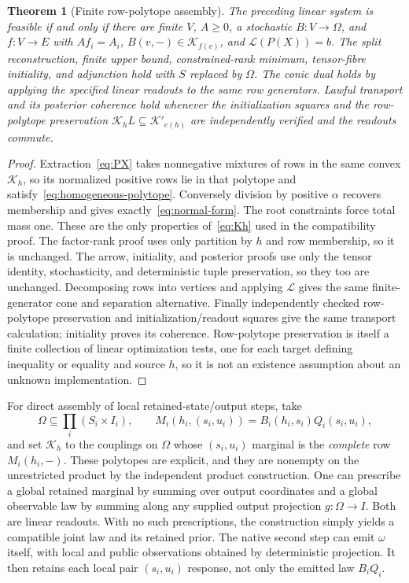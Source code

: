 \documentclass[11pt]{article}
\newcommand{\Kcal}{\mathcal K}
\newtheorem{theorem}{Theorem}[section]
\theoremstyle{remark}
\begin{document}
\begin{theorem}[Finite row-polytope assembly]\label{thm:umbrella}
The preceding linear system is feasible if and only if there are finite $V$, $A\ge0$, a stochastic $B:V\to\Omega$, and $f:V\to E$ with $Af_i=A_i$, $B(v,-)\in\Kcal_{f(v)}$, and $\mathcal L(P(X))=b$. The split reconstruction, finite upper bound, constrained-rank minimum, tensor-fibre initiality, and adjunction hold with $S$ replaced by $\Omega$. The conic dual holds by applying the specified linear readouts to the same row generators. Lawful transport and its posterior coherence hold whenever the initialization squares and the row-polytope preservation $\Kcal_hL\subseteq\Kcal'_{e(h)}$ are independently verified and the readouts commute.
\end{theorem}
\begin{proof}
Extraction~\eqref{eq:PX} takes nonnegative mixtures of rows in the same convex $\Kcal_h$, so its normalized positive rows lie in that polytope and satisfy~\eqref{eq:homogeneous-polytope}. Conversely division by positive $\alpha$ recovers membership and gives exactly~\eqref{eq:normal-form}. The root constraints force total mass one. These are the only properties of~\eqref{eq:Kh} used in the compatibility proof. The factor-rank proof uses only partition by $h$ and row membership, so it is unchanged. The arrow, initiality, and posterior proofs use only the tensor identity, stochasticity, and deterministic tuple preservation, so they too are unchanged. Decomposing rows into vertices and applying $\mathcal L$ gives the same finite-generator cone and separation alternative. Finally independently checked row-polytope preservation and initialization/readout squares give the same transport calculation; initiality proves its coherence. Row-polytope preservation is itself a finite collection of linear optimization tests, one for each target defining inequality or equality and source $h$, so it is not an existence assumption about an unknown implementation.
\end{proof}

For direct assembly of local retained-state/output steps, take
\[
 \Omega\subseteq\prod_i(S_i\times I_i),\qquad
 M_i(h_i,(s_i,u_i))=B_i(h_i,s_i)Q_i(s_i,u_i),
\]
and set $\Kcal_h$ to the couplings on $\Omega$ whose $(s_i,u_i)$ marginal is the \emph{complete} row $M_i(h_i,-)$. These polytopes are explicit, and they are nonempty on the unrestricted product by the independent product construction. One can prescribe a global retained marginal by summing over output coordinates and a global observable law by summing along any supplied output projection $g:\Omega\to I$. Both are linear readouts. With no such prescriptions, the construction simply yields a compatible joint law and its retained prior. The native second step can emit $\omega$ itself, with local and public observations obtained by deterministic projection. It then retains each local pair $(s_i,u_i)$ response, not only the emitted law $B_iQ_i$.
\end{document}
